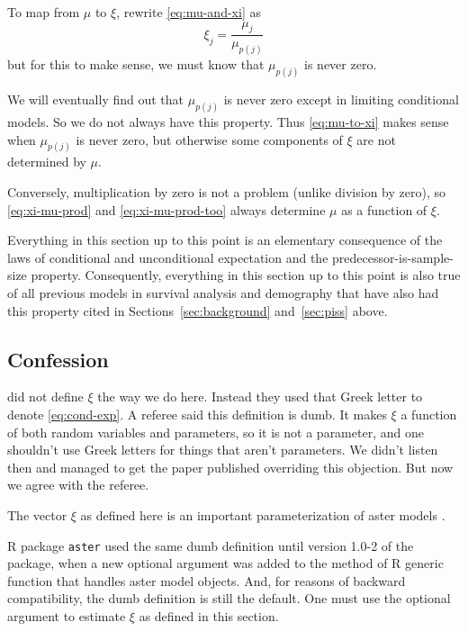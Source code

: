To map from $\mu$ to $\xi$, rewrite \eqref{eq:mu-and-xi} as
\begin{equation} \label{eq:mu-to-xi}
   \xi_j = \frac{\mu_j}{\mu_{p(j)}}
\end{equation}
but for this to make sense, we must know that $\mu_{p(j)}$ is never zero.

We will eventually find out that $\mu_{p(j)}$ is never zero except in
limiting conditional models.  So we do not always have this property.
Thus \eqref{eq:mu-to-xi} makes sense when $\mu_{p(j)}$ is never zero,
but otherwise some components of $\xi$ are not determined by $\mu$.

Conversely, multiplication by zero is not a problem (unlike division by zero),
so \eqref{eq:xi-mu-prod} and \eqref{eq:xi-mu-prod-too} always determine
$\mu$ as a function of $\xi$.

Everything in this section up to this point is an elementary consequence
of the laws of conditional and unconditional expectation and the
predecessor-is-sample-size property.  Consequently,
everything in this section up to this point is also true of all previous
models in survival analysis and demography that have also had this property
cited in Sections~\ref{sec:background} and~\ref{sec:piss} above.

\subsection{Confession}

 did not define $\xi$
the way we do here.  Instead they used that Greek letter to denote
\eqref{eq:cond-exp}.
A referee said this definition is dumb.  It makes $\xi$ a function
of both random variables and parameters, so it is not a parameter,
and one shouldn't use Greek letters for things that aren't parameters.
We didn't listen then and managed to get the
paper published overriding this objection.  But now we agree with the referee.

The vector $\xi$ as defined here is an important parameterization of
aster models \citep[this has been realized since][]{aster-philosophical}.

R package \texttt{aster} used the same dumb definition until version
1.0-2 of the package, when a new optional argument 
was added to the method of R generic function  that handles
aster model objects.  And, for reasons of backward compatibility,
the dumb definition is still the default.
One must use the optional argument 
to estimate $\xi$ as defined in this section.

